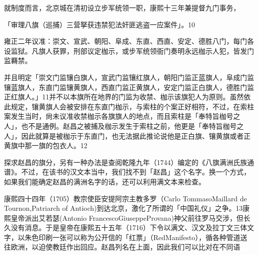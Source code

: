 就制度而言，北京城在清初设立步军统领一职，康熙十三年兼提督九门事务，

\vfill
\begin{BookNotes}
\end{BookNotes}

\noindent 「审理八旗（巡捕）三营拏获违禁犯法奸匪逃盗一应案件」。10

\begin{BookQuote}
雍正二年议准：崇文、宣武、朝阳、阜成、东直、西直、安定、德胜八门，每门各设监狱。凡旗人获罪，刑部议定枷示，或步军统领衙门奏明永远枷示人犯，皆发门监羇禁。
\end{BookQuote}

并且明定「崇文门监镶白旗人，宣武门监镶红旗人，朝阳门监正蓝旗人，阜成门监镶蓝旗人，东直门监镶黄旗人，西直门监正黄旗人，安定门监正白旗人，德胜门监正红旗人。」11并不以本旗所在地界的门监为收禁、枷示该旗犯人为原则。虽然依此规定，镶黄旗人会被安排在东直门枷示，与索柱的个案正好相符，不过，在索柱案发生当时，尙未议准收禁枷示各旗旗人的地点，而且索柱是「奉特旨枷号之人」，也不是通例。赵昌之被捕及枷示发生于索柱之前，他更是「奉特旨枷号之人」，因此就算是被枷示于东直门，也无法据此推论说他是正白旗、镶黄旗或者正黄旗中那一旗的包衣人。12

探求赵昌的旗分，另有一种办法是查阅乾隆九年（1744）编定的《八旗满洲氏族通谱》。不过，在该书的汉文本当中，我们找不到「赵昌」这个名字。换一个方式，如果我们能确定赵昌的满洲名字的话，还可以利用满文本来检查。

康熙四十四年（1705）教宗使臣安提阿宗主教多罗（Carlo TommasoMaillard de Tournon,Patriarch of Antioch)到达北京，激化了所谓的「中国礼仪」之争。13康熙皇帝派出艾若瑟(Antonio FrancescoGiuseppeProvana)神父前往罗马交涉，但长久没有消息。于是皇帝在康熙五十五年（1716）下令以满文、汉文及拉丁文三体文字，以朱色印刷一张可以称为公开信的「红票」（RedManifesto），循各种管道送往欧洲，以迫使教廷作出回应。赵昌列名在上面，因此我们可以比对在不同语

